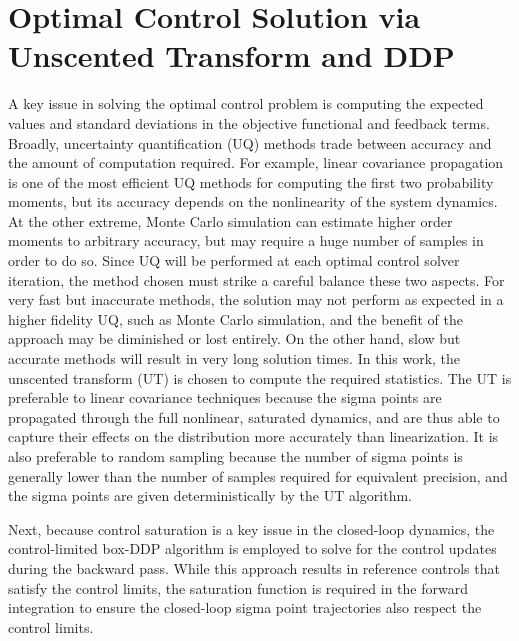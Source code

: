 \documentclass[journal ]{new-aiaa}
\begin{document}
\section*{Optimal Control Solution via Unscented Transform and DDP}
A key issue in solving the optimal control problem is computing the expected values and standard deviations in the objective functional and feedback terms. Broadly, uncertainty quantification (UQ) methods trade between accuracy and the amount of computation required. For example, linear covariance propagation is one of the most efficient UQ methods for computing the first two probability moments, but its accuracy depends on the nonlinearity of the system dynamics. At the other extreme, Monte Carlo simulation can estimate higher order moments to arbitrary accuracy, but may require a huge number of samples in order to do so. Since UQ will be performed at each optimal control solver iteration, the method chosen must strike a careful balance these two aspects. For very fast but inaccurate methods, the solution may not perform as expected in a higher fidelity UQ, such as Monte Carlo simulation, and the benefit of the approach may be diminished or lost entirely. On the other hand, slow but accurate methods will result in very long solution times. In this work, the unscented transform (UT) \cite{UT1997} is chosen to compute the required statistics. The UT is preferable to linear covariance techniques because the sigma points are propagated through the full nonlinear, saturated dynamics, and are thus able to capture their effects on the distribution more accurately than linearization. 
It is also preferable to random sampling because the number of sigma points is generally lower than the number of samples required for equivalent precision, and the sigma points are given deterministically by the UT algorithm. %

Next, because control saturation is a key issue in the closed-loop dynamics, the control-limited box-DDP algorithm \cite{DDP_ControlLimited} is employed to solve for the control updates during the backward pass. While this approach results in reference controls that satisfy the control limits, the saturation function is required in the forward integration to ensure the closed-loop sigma point trajectories also respect the control limits.
\end{document}
